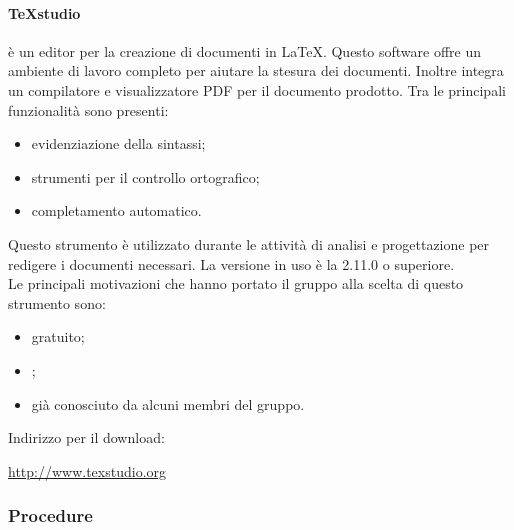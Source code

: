 		\paragraph{TeXstudio}\label{sec:texstudio}
		 è un editor per la creazione di documenti in \LaTeX. Questo software offre un ambiente di lavoro completo per aiutare la stesura dei documenti. Inoltre integra un compilatore e visualizzatore PDF per il documento prodotto. Tra le principali funzionalità sono presenti:
		\begin{itemize}
			\item evidenziazione della sintassi;
			\item strumenti per il controllo ortografico;
			\item completamento automatico.
		\end{itemize}
		Questo strumento è utilizzato durante le attività di analisi e progettazione per redigere i documenti necessari. La versione in uso è la 2.11.0 o superiore. \\
		Le principali motivazioni che hanno portato il gruppo alla scelta di questo strumento sono:
		\begin{itemize}
			\item gratuito;
			\item {};
			\item già conosciuto da alcuni membri del gruppo.
		\end{itemize}
		Indirizzo per il download:
		\begin{center}
			\url{http://www.texstudio.org}
		\end{center}
		
        \subsubsection{Procedure}
